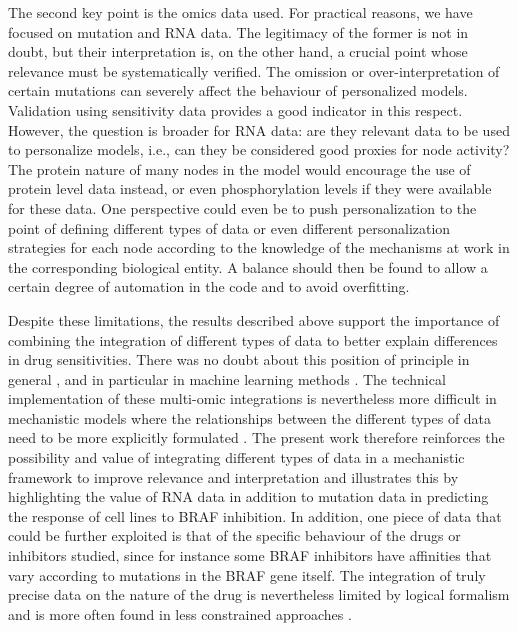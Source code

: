 \documentclass[a4paper,12pt,twoside,onecolumn,openright,final,oldfontcommands]{memoir}
\begin{document}
The second key point is the omics data used. For practical reasons, we
have focused on mutation and RNA data. The legitimacy of the former is
not in doubt, but their interpretation is, on the other hand, a crucial
point whose relevance must be systematically verified. The omission or
over-interpretation of certain mutations can severely affect the
behaviour of personalized models. Validation using sensitivity data
provides a good indicator in this respect. However, the question is
broader for RNA data: are they relevant data to be used to personalize
models, i.e., can they be considered good proxies for node activity? The
protein nature of many nodes in the model would encourage the use of
protein level data instead, or even phosphorylation levels if they were
available for these data. One perspective could even be to push
personalization to the point of defining different types of data or even
different personalization strategies for each node according to the
knowledge of the mechanisms at work in the corresponding biological
entity. A balance should then be found to allow a certain degree of
automation in the code and to avoid overfitting.

Despite these limitations, the results described above support the
importance of combining the integration of different types of data to
better explain differences in drug sensitivities. There was no doubt
about this position of principle in general
\citep{azuaje2017computational}, and in particular in machine learning
methods
\citetext{\citealp{costello2014community}; \citealp{aben2016tandem}}.
The technical implementation of these multi-omic integrations is
nevertheless more difficult in mechanistic models where the
relationships between the different types of data need to be more
explicitly formulated \citep{klinger2013network}. The present work
therefore reinforces the possibility and value of integrating different
types of data in a mechanistic framework to improve relevance and
interpretation and illustrates this by highlighting the value of RNA
data in addition to mutation data in predicting the response of cell
lines to BRAF inhibition. In addition, one piece of data that could be
further exploited is that of the specific behaviour of the drugs or
inhibitors studied, since for instance some BRAF inhibitors have
affinities that vary according to mutations in the BRAF gene itself. The
integration of truly precise data on the nature of the drug is
nevertheless limited by logical formalism and is more often found in
less constrained approaches \citep{manica2019toward}.
\end{document}
